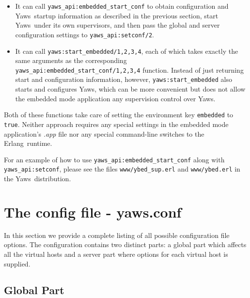 \documentclass[11pt,oneside,english]{book}
\newcommand{\Erlang}            %
        {{\sc Erlang}}
\newcommand{\Yaws}            %
        {{\sc Yaws}}
\begin{document}
\begin{itemize}

\item It can call \verb+yaws_api:embedded_start_conf+ to obtain
  configuration and \Yaws\  startup information as described in the
  previous section, start \Yaws\  under its own supervisors, and then
  pass the global and server configuration settings to
  \verb+yaws_api:setconf/2+.

\item It can call \verb+yaws:start_embedded/1,2,3,4+, each of which
  takes exactly the same arguments as the corresponding
  \verb+yaws_api:embedded_start_conf/1,2,3,4+ function. Instead of just
  returning start and configuration information, however,
  \verb+yaws:start_embedded+ also starts and configures \Yaws{}, which
  can be more convenient but does not allow the embedded mode
  application any supervision control over \Yaws{}.

\end{itemize}

Both of these functions take care of setting the environment key
\verb+embedded+ to \verb+true+. Neither approach requires any special
settings in the embedded mode application's \textit{.app} file nor any
special command-line switches to the \Erlang\  runtime.

For an example of how to use \verb+yaws_api:embedded_start_conf+ along
with \verb+yaws_api:setconf+, please see the files
\verb+www/ybed_sup.erl+ and \verb+www/ybed.erl+ in the
\Yaws\  distribution.

\chapter{The config file - yaws.conf}

In this section we provide a complete listing of all possible
configuration file options.  The configuration contains two distinct
parts: a global part which affects all the virtual hosts and a server
part where options for each virtual host is supplied.

\section{Global Part}
\end{document}
